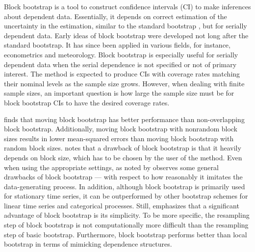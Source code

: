 \documentclass[10pt]{article}
\begin{document}
Block bootstrap is a tool to construct confidence intervals (CI) to make
inferences about dependent data. Essentially, it depends on correct estimation
of the uncertainty in the estimation, similar to the standard bootstrap 
\citep{efron1979bootstrap}, but for serially dependent data.
Early ideas of block bootstrap were developed not long after the standard 
bootstrap.\citep{hall1985resampling, carlstein1986use,kunsch1989jackknife} It 
has since
been applied in various fields, for instance, econometrics and 
meteorology.\citep{mackinnon2006bootstrap, varga2017generalised}
Block bootstrap is especially useful for serially dependent data when the serial 
dependence is not specified or not of primary interest. The method is expected 
to produce CIs with coverage rates matching their nominal levels as the sample 
size grows.\citep{calhoun2018} However, when dealing with finite sample sizes, 
an important 
question is how large the sample size must be for block bootstrap CIs to have 
the desired coverage rates.


\citet{lahiri1999theoretical} finds that moving block bootstrap has better 
performance than non-overlapping block bootstrap. Additionally, moving block 
bootstrap with nonrandom
block sizes results in lower mean-squared errors than moving block bootstrap
with random block sizes. \citet{buhlmann1999block} notes that a drawback of 
block bootstrap is that it heavily depends on block size, which has to be chosen
by the user of the method.
Even when using the appropriate settings, as noted by
\citet{buhlmann2002bootstraps} observes some general drawbacks of block 
bootstrap --- with respect to how reasonably it imitates the data-generating 
process. In addition, although block bootstrap is primarily used for stationary 
time series, it can be outperformed by other bootstrap schemes for linear time
series and categorical processes. Still, \citet{buhlmann2002bootstraps}
emphasizes that a significant advantage of block bootstrap is its simplicity.
To be more specific, the resampling step of block bootstrap is not 
computationally more difficult than the resampling step of basic bootstrap.
Furthermore, block bootstrap performs better than local bootstrap in terms of
mimicking dependence structures.
\end{document}
